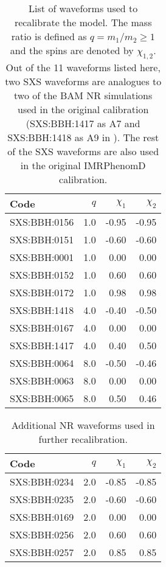 \documentclass[twocolumn]{aastex631}
\begin{document}
\begin{table}[t]
	\centering
	\begin{tabularx}{0.8\columnwidth}{@{\extracolsep{\fill}}lrrr}
		\toprule\midrule Code         & $q$ & $\chi_1$ & $\chi_2$ \\
		\midrule\midrule SXS:BBH:0156 & 1.0 & -0.95    & -0.95    \\
		SXS:BBH:0151 & 1.0 & -0.60    & -0.60    \\
		SXS:BBH:0001 & 1.0 &  0.00    &  0.00    \\
		SXS:BBH:0152 & 1.0 &  0.60    &  0.60    \\
		SXS:BBH:0172 & 1.0 &  0.98    &  0.98    \\
		SXS:BBH:1418 & 4.0 & -0.40    & -0.50    \\
		SXS:BBH:0167 & 4.0 &  0.00    &  0.00    \\
		SXS:BBH:1417 & 4.0 &  0.40    &  0.50    \\
		SXS:BBH:0064 & 8.0 & -0.50    & -0.46    \\
		SXS:BBH:0063 & 8.0 &  0.00    &  0.00    \\
		SXS:BBH:0065 & 8.0 &  0.50    &  0.46    \\ \midrule\bottomrule
	\end{tabularx}
	\caption{List of waveforms used to recalibrate the model. The mass ratio is defined as
	$q=m_1/m_2\geq 1$ and the spins are denoted by $\chi_{1,2}$. Out of the 11 waveforms listed
	here, two SXS waveforms are analogues to two of the BAM NR simulations used in the original calibration (SXS:BBH:1417 as A7 and SXS:BBH:1418 as A9 in \citep{khan2016frequency}). The rest of the SXS waveforms are also used in the original IMRPhenomD calibration.}
	\label{tab:q148}
\end{table}
\begin{table}[t]
	\centering
	\begin{tabularx}{0.8\columnwidth}{@{\extracolsep{\fill}}lrrr}
		\toprule\midrule Code         & $q$ & $\chi_1$ & $\chi_2$ \\
		\midrule\midrule SXS:BBH:0234 & 2.0 & -0.85    & -0.85    \\
		SXS:BBH:0235 & 2.0 & -0.60    & -0.60    \\
		SXS:BBH:0169 & 2.0 & 0.00     & 0.00     \\
		SXS:BBH:0256 & 2.0 & 0.60     & 0.60     \\
		SXS:BBH:0257 & 2.0 & 0.85     & 0.85     \\ \midrule\bottomrule
	\end{tabularx}
	\caption{Additional NR waveforms used in further recalibration.}
	\label{tab:q1248}
\end{table}
\end{document}
